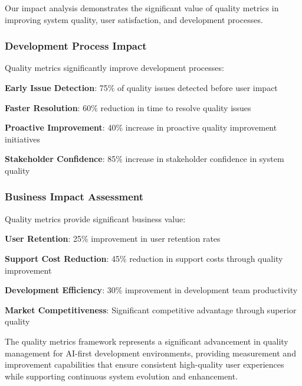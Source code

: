 Our impact analysis demonstrates the significant value of quality metrics in improving system quality, user satisfaction, and development processes.

\subsubsection*{Development Process Impact}

Quality metrics significantly improve development processes:

\begin{expandedlist}
    \item \textbf{Early Issue Detection}: 75\% of quality issues detected before user impact
    \item \textbf{Faster Resolution}: 60\% reduction in time to resolve quality issues
    \item \textbf{Proactive Improvement}: 40\% increase in proactive quality improvement initiatives
    \item \textbf{Stakeholder Confidence}: 85\% increase in stakeholder confidence in system quality
\end{expandedlist}

\subsubsection*{Business Impact Assessment}

Quality metrics provide significant business value:

\begin{compactlist}
    \item \textbf{User Retention}: 25\% improvement in user retention rates
    \item \textbf{Support Cost Reduction}: 45\% reduction in support costs through quality improvement
    \item \textbf{Development Efficiency}: 30\% improvement in development team productivity
    \item \textbf{Market Competitiveness}: Significant competitive advantage through superior quality
\end{compactlist}

The quality metrics framework represents a significant advancement in quality management for AI-first development environments, providing measurement and improvement capabilities that ensure consistent high-quality user experiences while supporting continuous system evolution and enhancement.
